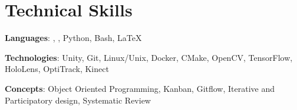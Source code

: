 \section{Technical Skills}
\cvSubHeadingListStart

\cvSubSubheading
{\textbf{Languages}: \CPP, \Csharp, Python, Bash, {\LaTeX}}{}

\cvSubSubheading
{\textbf{Technologies}: Unity, Git, Linux/Unix, Docker, CMake, OpenCV, TensorFlow, HoloLens, OptiTrack, Kinect}{}

\cvSubSubheading
{\textbf{Concepts}: Object Oriented Programming, Kanban, Gitflow, Iterative and Participatory design, Systematic Review}{}


\vspace{5pt}
\cvSubHeadingListEnd
